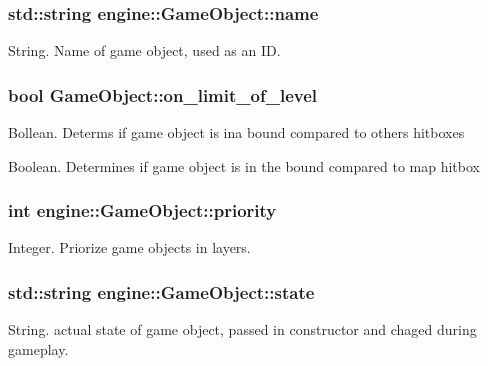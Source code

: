 \subsubsection[{\texorpdfstring{name}{name}}]{\setlength{\rightskip}{0pt plus 5cm}std\+::string engine\+::\+Game\+Object\+::name}\hypertarget{classengine_1_1_game_object_a1f104f7af4f351e6d3278319762c9fe5}{}\label{classengine_1_1_game_object_a1f104f7af4f351e6d3278319762c9fe5}
String. Name of game object, used as an ID. 
\subsubsection[{\texorpdfstring{on\+\_\+limit\+\_\+of\+\_\+level}{on_limit_of_level}}]{\setlength{\rightskip}{0pt plus 5cm}bool Game\+Object\+::on\+\_\+limit\+\_\+of\+\_\+level\hspace{0.3cm}{\ttfamily [static]}}\hypertarget{classengine_1_1_game_object_aea78ad4cdb280a61b050b89a280af7bd}{}\label{classengine_1_1_game_object_aea78ad4cdb280a61b050b89a280af7bd}
Bollean. Determs if game object is ina bound compared to others hitboxes

Boolean. Determines if game object is in the bound compared to map hitbox 
\subsubsection[{\texorpdfstring{priority}{priority}}]{\setlength{\rightskip}{0pt plus 5cm}int engine\+::\+Game\+Object\+::priority}\hypertarget{classengine_1_1_game_object_a159ecaca30229e302793b11a75bd13c2}{}\label{classengine_1_1_game_object_a159ecaca30229e302793b11a75bd13c2}
Integer. Priorize game objects in layers. 
\subsubsection[{\texorpdfstring{state}{state}}]{\setlength{\rightskip}{0pt plus 5cm}std\+::string engine\+::\+Game\+Object\+::state}\hypertarget{classengine_1_1_game_object_a485c6dde0f7daed4ce480d577e621f87}{}\label{classengine_1_1_game_object_a485c6dde0f7daed4ce480d577e621f87}
String. actual state of game object, passed in constructor and chaged during gameplay. 
